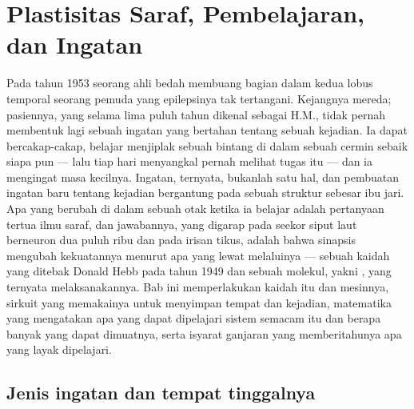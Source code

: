 \chapter{Plastisitas Saraf, Pembelajaran, dan Ingatan}\label{ch:b3:learning-memory}

Pada tahun 1953 seorang ahli bedah membuang bagian dalam kedua lobus temporal
seorang pemuda yang epilepsinya tak tertangani. Kejangnya mereda; pasiennya,
yang selama lima puluh tahun dikenal sebagai H.M., tidak pernah membentuk lagi
sebuah ingatan yang bertahan tentang sebuah kejadian. Ia dapat bercakap-cakap,
belajar menjiplak sebuah bintang di dalam sebuah cermin sebaik siapa pun --- lalu
tiap hari menyangkal pernah melihat tugas itu --- dan ia mengingat masa kecilnya.
Ingatan, ternyata, bukanlah satu hal, dan pembuatan ingatan baru tentang kejadian
bergantung pada sebuah struktur sebesar ibu jari. Apa yang berubah di dalam sebuah
otak ketika ia belajar adalah pertanyaan tertua ilmu saraf, dan jawabannya, yang
digarap pada seekor siput laut berneuron dua puluh ribu dan pada irisan 
tikus, adalah bahwa sinapsis mengubah kekuatannya menurut apa
yang lewat melaluinya --- sebuah kaidah yang ditebak Donald Hebb pada tahun 1949 dan
sebuah molekul, yakni , yang ternyata melaksanakannya. Bab ini
memperlakukan kaidah itu dan mesinnya, sirkuit yang memakainya untuk menyimpan
tempat dan kejadian, matematika yang mengatakan apa yang dapat dipelajari sistem
semacam itu dan berapa banyak yang dapat dimuatnya, serta isyarat ganjaran yang
memberitahunya apa yang layak dipelajari.

\section{Jenis ingatan dan tempat tinggalnya}

